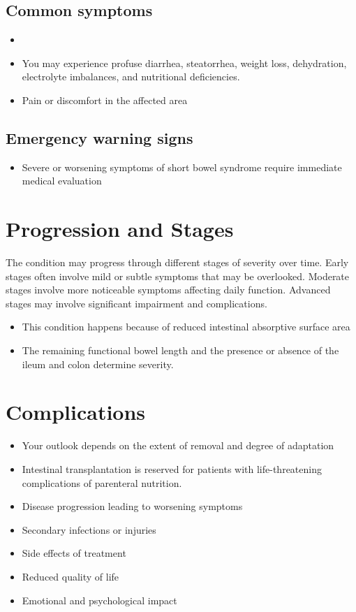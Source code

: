 \subsection{Common symptoms}
\begin{itemize}[noitemsep]
  \item \item You may experience profuse diarrhea, steatorrhea, weight loss, dehydration, electrolyte imbalances, and nutritional deficiencies.

  \item Pain or discomfort in the affected area
  \end{itemize}

\subsection{Emergency warning signs}
\begin{itemize}[noitemsep]
  \item Severe or worsening symptoms of short bowel syndrome require immediate medical evaluation
\end{itemize}
\section{Progression and Stages}
The condition may progress through different stages of severity over time. Early stages often involve mild or subtle symptoms that may be overlooked. Moderate stages involve more noticeable symptoms affecting daily function. Advanced stages may involve significant impairment and complications.

\begin{itemize}[noitemsep]
  \item This condition happens because of reduced intestinal absorptive surface area
  \item The remaining functional bowel length and the presence or absence of the ileum and colon determine severity.
\end{itemize}
\section{Complications}
\begin{itemize}[noitemsep]
  \item Your outlook depends on the extent of removal and degree of adaptation
  \item Intestinal transplantation is reserved for patients with life-threatening complications of parenteral nutrition.
  \item Disease progression leading to worsening symptoms
  \item Secondary infections or injuries
  \item Side effects of treatment
  \item Reduced quality of life
  \item Emotional and psychological impact
\end{itemize}
